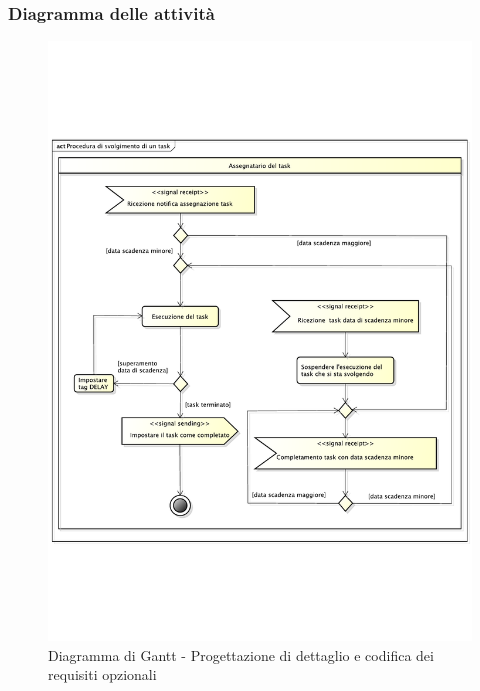 		\subsubsection{Diagramma delle attività} %
		\label{ssub:diagramma_delle_attivita}
			\begin{figure}[htbp]
				\centering
				\includegraphics[width=14cm]{images/proc_svolgimento_task.pdf}
				\caption{Diagramma di Gantt - Progettazione di dettaglio e codifica dei requisiti opzionali}
				\label{fig:gantt_prog_dett_cod_requisiti_opzionali}				
			\end{figure}
	
